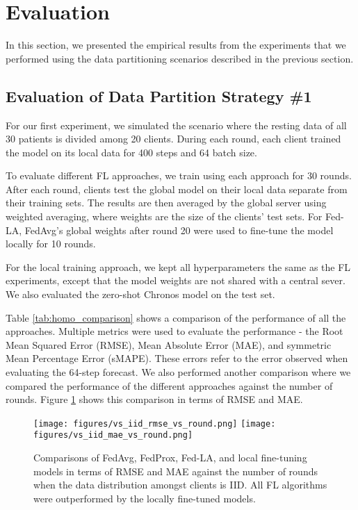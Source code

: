 \section{Evaluation}
In this section, we presented the empirical results from the experiments that we performed using the data partitioning scenarios described in the previous section.  

\subsection{Evaluation of Data Partition Strategy \#1}
For our first experiment, we simulated the scenario where the resting data of all 30 patients is divided among 20 clients. 
During each round, each client trained the model on its local data for 400 steps and 64 batch size.

To evaluate different FL approaches, we train using each approach for 30 rounds. 
After each round, clients test the global model on their local data separate from their training sets. 
The results are then averaged by the global server using weighted averaging, where weights are the size of the clients' test sets.
For Fed-LA, FedAvg's global weights after round 20 were used to fine-tune the model locally for 10 rounds.

For the local training approach, we kept all hyperparameters the same as the FL experiments, except that the model weights are not shared with a central sever. 
We also evaluated the zero-shot Chronos model on the test set.

Table \ref{tab:homo_comparison} shows a comparison of the performance of all the approaches. 
Multiple metrics were used to evaluate the performance - the Root Mean Squared Error (RMSE), Mean Absolute Error (MAE), and symmetric Mean Percentage Error (sMAPE). 
These errors refer to the error observed when evaluating the 64-step forecast. 
We also performed another comparison where we compared the performance of the different approaches against the number of rounds. 
Figure \ref{figs:homo_comparison} shows this comparison in terms of RMSE and MAE. 

\begin{figure}
  \texttt{[image: figures/vs\_iid\_rmse\_vs\_round.png]}
  \texttt{[image: figures/vs\_iid\_mae\_vs\_round.png]}
  \caption{{Comparisons of FedAvg, FedProx, Fed-LA, and local fine-tuning models in terms of RMSE and MAE against the number of rounds when the data distribution amongst clients is IID. 
  All FL algorithms were outperformed by the locally fine-tuned models.}}
  \label{figs:homo_comparison}
\end{figure}

